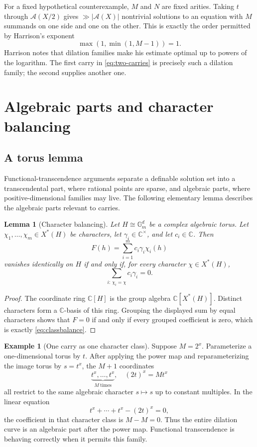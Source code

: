 \documentclass[11pt,oneside]{article}
\newtheorem{lemma}[theorem]{Lemma}
\theoremstyle{definition}
\newtheorem{example}[theorem]{Example}
\newcommand{\C}{\mathbb{C}}
\newcommand{\Gm}{\mathbb{G}_{m}}
\newcommand{\cA}{\mathscr{A}}
\begin{document}
For a fixed hypothetical counterexample, $M$ and $N$ are fixed arities.  Taking $t$ through $\cA(X/2)$ gives $\gg|\cA(X)|$ nontrivial solutions to an equation with $M$ summands on one side and one on the other.  This is exactly the order permitted by Harrison's exponent
\[
       \max(1,\min(1,M-1))=1.
\]
Harrison notes that dilation families make his estimate optimal up to powers of the logarithm.  The first carry in \eqref{eq:two-carries} is precisely such a dilation family; the second supplies another one.

\section{Algebraic parts and character balancing}

\subsection{A torus lemma}

Functional-transcendence arguments separate a definable solution set into a transcendental part, where rational points are sparse, and algebraic parts, where positive-dimensional families may live.  The following elementary lemma describes the algebraic parts relevant to carries.

\begin{lemma}[Character balancing]\label{lem:characterbalance}
Let $H\cong\Gm^d$ be a complex algebraic torus.  Let
$\chi_1,\ldots,\chi_m\in X^*(H)$ be characters, let
$\gamma_i\in\C^\times$, and let $c_i\in\C$.  Then
\[
       F(h)=\sum_{i=1}^m c_i\gamma_i\chi_i(h)
\]
vanishes identically on $H$ if and only if, for every character
$\chi\in X^*(H)$,
\begin{equation}\label{eq:classbalance}
       \sum_{i:\,\chi_i=\chi}c_i\gamma_i=0.
\end{equation}
\end{lemma}

\begin{proof}
The coordinate ring $\C[H]$ is the group algebra
$\C[X^*(H)]$.  Distinct characters form a $\C$-basis of this ring.  Grouping the displayed sum by equal characters shows that $F=0$ if and only if every grouped coefficient is zero, which is exactly \eqref{eq:classbalance}.
\end{proof}

\begin{example}[One carry as one character class]\label{ex:onecarry}
Suppose $M=2^x$.  Parameterize a one-dimensional torus by $t$.  After applying the power map and reparameterizing the image torus by $s=t^x$, the $M+1$ coordinates
\[
      \underbrace{t^x,\ldots,t^x}_{M\ \text{times}},
      \quad (2t)^x=M t^x
\]
all restrict to the same algebraic character $s\mapsto s$ up to constant multiples.  In the linear equation
\[
      t^x+\cdots+t^x-(2t)^x=0,
\]
the coefficient in that character class is $M-M=0$.  Thus the entire dilation curve is an algebraic part after the power map.  Functional transcendence is behaving correctly when it permits this family.
\end{example}
\end{document}
